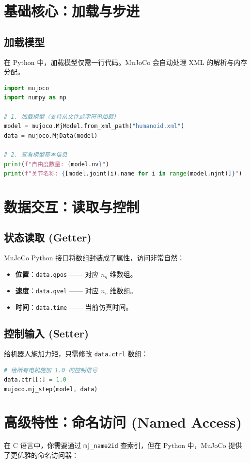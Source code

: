 \documentclass[11pt,a4paper]{book}
\begin{document}
\section{基础核心：加载与步进}

\subsection{加载模型}
在 Python 中，加载模型仅需一行代码。MuJoCo 会自动处理 XML 的解析与内存分配。

\begin{lstlisting}[language=Python, caption={Python 基础加载流程}]
import mujoco
import numpy as np

# 1. 加载模型（支持从文件或字符串加载）
model = mujoco.MjModel.from_xml_path("humanoid.xml")
data = mujoco.MjData(model)

# 2. 查看模型基本信息
print(f"自由度数量: {model.nv}")
print(f"关节名称: {[model.joint(i).name for i in range(model.njnt)]}")
\end{lstlisting}

\section{数据交互：读取与控制}

\subsection{状态读取 (Getter)}
MuJoCo Python 接口将数组封装成了属性，访问非常自然：
\begin{itemize}
    \item \textbf{位置}：\texttt{data.qpos} —— 对应 $n_q$ 维数组。
    \item \textbf{速度}：\texttt{data.qvel} —— 对应 $n_v$ 维数组。
    \item \textbf{时间}：\texttt{data.time} —— 当前仿真时间。
\end{itemize}

\subsection{控制输入 (Setter)}
给机器人施加力矩，只需修改 \texttt{data.ctrl} 数组：
\begin{lstlisting}[language=Python]
# 给所有电机施加 1.0 的控制信号
data.ctrl[:] = 1.0
mujoco.mj_step(model, data)
\end{lstlisting}



\section{高级特性：命名访问 (Named Access)}
在 C 语言中，你需要通过 \texttt{mj\_name2id} 查索引，但在 Python 中，MuJoCo 提供了更优雅的命名访问器：
\end{document}
